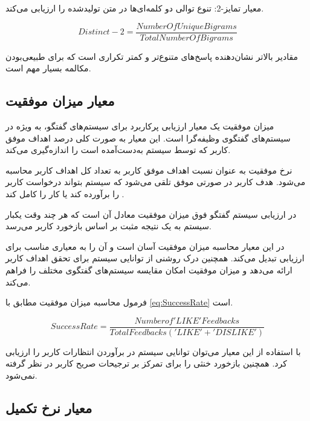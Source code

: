 معیار تمایز-2: تنوع توالی دو کلمه‌ای‌ها در متن تولیدشده را ارزیابی می‌کند.
\begin{LTR}
\begin{equation}
Distinct-2 = \frac{NumberOfUniqueBigrams}{TotalNumberOfBigrams}
\end{equation}
\end{LTR}

 مقادیر بالاتر نشان‌دهنده پاسخ‌های متنوع‌تر و کمتر تکراری است که برای طبیعی‌بودن مکالمه بسیار مهم است.

\subsection[معیار میزان موفقیت]{معیار میزان موفقیت}

میزان موفقیت یک معیار ارزیابی پرکاربرد برای سیستم‌های گفتگو، به ویژه در سیستم‌های گفتگوی وظیفه‌گرا است. این معیار به صورت کلی درصد اهداف موفق کاربر که توسط سیستم به‌دست‌آمده است را اندازه‌گیری می‌کند.

نرخ موفقیت به عنوان نسبت اهداف موفق کاربر به تعداد کل اهداف کاربر محاسبه می‌شود. هدف کاربر در صورتی موفق تلقی می‌شود که سیستم بتواند درخواست کاربر را برآورده کند یا کار را کامل کند%
\cite{sekulic2024reliable} .

در ارزیابی سیستم گفتگو فوق میزان موفقیت معادل آن است که هر چند وقت یکبار سیستم به یک نتیجه مثبت بر اساس بازخورد کاربر می‌رسد.

در این معیار محاسبه میزان موفقیت آسان است و آن‌ را به معیاری مناسب برای ارزیابی تبدیل می‌کند. همچنین درک روشنی از توانایی سیستم برای تحقق اهداف کاربر ارائه می‌دهد و میزان موفقیت امکان مقایسه سیستم‌های گفتگوی مختلف را فراهم می‌کند. 

فرمول محاسبه میزان موفقیت مطابق با 
\ref{eq:SuccessRate}
است.

\begin{LTR}
\begin{equation}
\label{eq:SuccessRate}
SuccessRate = \frac{Number of 'LIKE' Feedbacks}{Total Feedbacks ('LIKE' + 'DISLIKE')}
\end{equation}
\end{LTR}

با استفاده از این معیار می‌توان توانایی سیستم در برآوردن انتظارات کاربر را ارزیابی کرد. همچنین بازخورد خنثی را برای تمرکز بر ترجیحات صریح کاربر در نظر گرفته نمی‌شود.


\subsection[معیار نرخ تکمیل]{معیار نرخ تکمیل}



